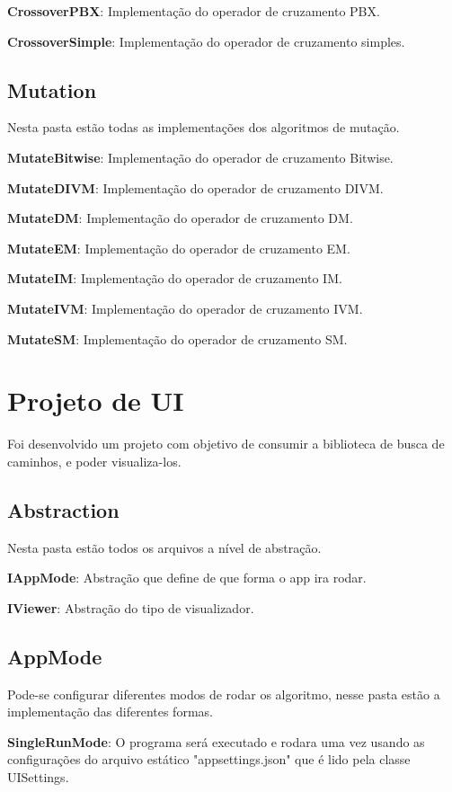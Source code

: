 \textbf{CrossoverPBX}: Implementação do operador de cruzamento PBX.

\textbf{CrossoverSimple}:  Implementação do operador de cruzamento simples.

\subsection{Mutation}

Nesta pasta estão todas as implementações dos algoritmos de mutação.

\textbf{MutateBitwise}: Implementação do operador de cruzamento Bitwise.

\textbf{MutateDIVM}: Implementação do operador de cruzamento DIVM.

\textbf{MutateDM}: Implementação do operador de cruzamento DM.

\textbf{MutateEM}: Implementação do operador de cruzamento EM.

\textbf{MutateIM}: Implementação do operador de cruzamento IM.

\textbf{MutateIVM}: Implementação do operador de cruzamento IVM.

\textbf{MutateSM}: Implementação do operador de cruzamento SM.


\section{Projeto de UI}

Foi desenvolvido um projeto com objetivo de consumir a biblioteca de busca de caminhos, e poder visualiza-los.

\subsection{Abstraction}

Nesta pasta estão todos os arquivos a nível de abstração.

\textbf{IAppMode}: Abstração que define de que forma o app ira rodar.

\textbf{IViewer}: Abstração do tipo de visualizador.

\subsection{AppMode}

Pode-se configurar diferentes modos de rodar os algoritmo, nesse pasta estão a implementação das diferentes formas.

\textbf{SingleRunMode}: O programa será executado e rodara uma vez usando as configurações do arquivo estático "appsettings.json" que é lido pela classe UISettings.


